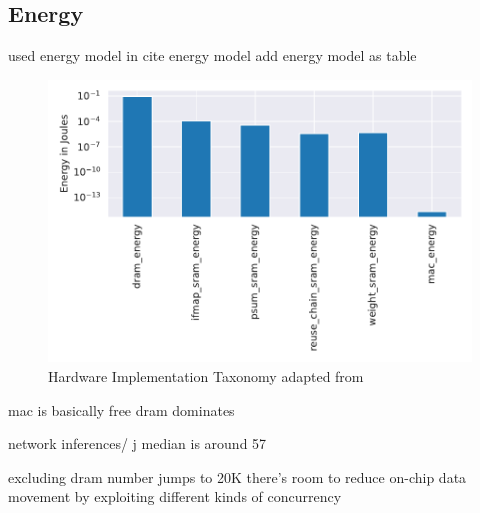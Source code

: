 \subsection{Energy}
\label{chap:hero:sim_platform:cigar_side}

used energy model in cite energy model
add energy model as table

\begin{figure}[ht]
    \centering
    \includegraphics[scale=0.58]{Plots/energy/barplot.pdf}
    \caption{Hardware Implementation Taxonomy adapted from \cite{maestro}}
    \label{fig:hw_taxonomy}
\end{figure}

mac is basically free
dram dominates

network inferences/ j median is around 57

excluding dram number jumps to 20K
there's room to reduce on-chip data movement by exploiting different kinds of
concurrency

